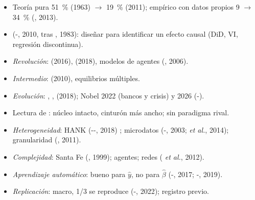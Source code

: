 \documentclass{article}
\begin{document}
\begin{columnas}
\begin{itemize}
\item Teoría pura 51~\% (1963) $\to$ 19~\% (2011); empírico con datos propios 9 $\to$ 34~\% (, 2013).
\item {} (-, 2010, tras , 1983): diseñar para identificar un efecto causal (DiD, VI, regresión discontinua).
\end{itemize}
\begin{itemize}
\item \emph{Revolución}:  (2016),  (2018), modelos de agentes (, 2006).
\item \emph{Intermedio}:  (2010), equilibrios múltiples.
\item \emph{Evolución}: , ,  (2018); Nobel 2022 (bancos y crisis) y 2026 (-).
\item Lectura de : núcleo intacto, cinturón más ancho; sin paradigma rival.
\end{itemize}
\begin{itemize}
\item \emph{Heterogeneidad}: HANK (--, 2018) ; microdatos (-, 2003;  \emph{et al.}, 2014); granularidad (, 2011).
\item \emph{Complejidad}: Santa Fe (, 1999); agentes; redes ( \emph{et al.}, 2012).
\item \emph{Aprendizaje automático}: bueno para $\hat y$, no para $\hat\beta$ (-, 2017; -, 2019).
\item \emph{Replicación}: macro, 1/3 se reproduce (-, 2022); registro previo.
\end{itemize}


\end{columnas}
\end{document}
